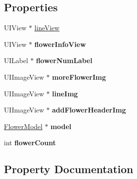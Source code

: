 \subsection*{Properties}
\begin{DoxyCompactItemize}
\item 
U\+I\+View $\ast$ \mbox{\hyperlink{interface_add_flower_user_cell_a134721bb88d84adaab9e0787b981d5bd}{line\+View}}
\item 
\mbox{\label{interface_add_flower_user_cell_a213dafd2248e1835597a180fa36183af}} 
U\+I\+View $\ast$ {\bfseries flower\+Info\+View}
\item 
\mbox{\label{interface_add_flower_user_cell_a29ac628fcc9790ef6ce82ab3d73605a3}} 
U\+I\+Label $\ast$ {\bfseries flower\+Num\+Label}
\item 
\mbox{\label{interface_add_flower_user_cell_a728339fdd36279743cc6fa682562aec3}} 
U\+I\+Image\+View $\ast$ {\bfseries more\+Flower\+Img}
\item 
\mbox{\label{interface_add_flower_user_cell_ae103b3630621529be4cec6d827c4331c}} 
U\+I\+Image\+View $\ast$ {\bfseries line\+Img}
\item 
\mbox{\label{interface_add_flower_user_cell_a3f40b8fe25ee40f4780b7e5929de9bbc}} 
U\+I\+Image\+View $\ast$ {\bfseries add\+Flower\+Header\+Img}
\item 
\mbox{\label{interface_add_flower_user_cell_a998e945bfee0ae6d9bf116a0a75bd666}} 
\mbox{\hyperlink{interface_flower_model}{Flower\+Model}} $\ast$ {\bfseries model}
\item 
\mbox{\label{interface_add_flower_user_cell_a748f1da3d86e5849191fc0ffe8d50e14}} 
int {\bfseries flower\+Count}
\end{DoxyCompactItemize}


\subsection{Property Documentation}
\mbox{\label{interface_add_flower_user_cell_a134721bb88d84adaab9e0787b981d5bd}} 
